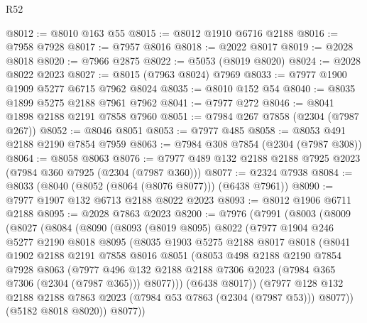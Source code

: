 \begin{lexlean}{R52}
\begin{coremodule}
@8012 := @8010 @163 @55
@8015 := @8012 @1910 @6716 @2188
@8016 := @7958 @7928
@8017 := @7957 @8016
@8018 := @2022 @8017
@8019 := @2028 @8018
@8020 := @7966 @2875
@8022 := @5053 (@8019 @8020)
@8024 := @2028 @8022 @2023
@8027 := @8015 (@7963 @8024) @7969
@8033 := @7977 @1900 @1909 @5277 @6715 @7962 @8024
@8035 := @8010 @152 @54
@8040 := @8035 @1899 @5275 @2188 @7961 @7962
@8041 := @7977 @272
@8046 := @8041 @1898 @2188 @2191 @7858 @7960
@8051 := @7984 @267 @7858 (@2304 (@7987 @267))
@8052 := @8046 @8051
@8053 := @7977 @485
@8058 := @8053 @491 @2188 @2190 @7854 @7959
@8063 := @7984 @308 @7854 (@2304 (@7987 @308))
@8064 := @8058 @8063
@8076 := @7977 @489 @132 @2188 @2188 @7925 @2023 (@7984 @360 @7925 (@2304 (@7987 @360)))
@8077 := @2324 @7938
@8084 := @8033 (@8040 (@8052 (@8064 (@8076 @8077))) (@6438 @7961))
@8090 := @7977 @1907 @132 @6713 @2188 @8022 @2023
@8093 := @8012 @1906 @6711 @2188
@8095 := @2028 @7863 @2023
@8200 := @7976
    (@7991
      (@8003
        (@8009
          (@8027
            (@8084
              (@8090
                (@8093
                  (@8019 @8095)
                  @8022
                  (@7977
                    @1904
                    @246
                    @5277
                    @2190
                    @8018
                    @8095
                    (@8035
                      @1903
                      @5275
                      @2188
                      @8017
                      @8018
                      (@8041
                        @1902
                        @2188
                        @2191
                        @7858
                        @8016
                        @8051
                        (@8053
                          @498
                          @2188
                          @2190
                          @7854
                          @7928
                          @8063
                          (@7977
                            @496
                            @132
                            @2188
                            @2188
                            @7306
                            @2023
                            (@7984 @365 @7306 (@2304 (@7987 @365)))
                            @8077)))
                      (@6438 @8017))
                    (@7977
                      @128
                      @132
                      @2188
                      @2188
                      @7863
                      @2023
                      (@7984 @53 @7863 (@2304 (@7987 @53)))
                      @8077))
                  (@5182 @8018 @8020))
                @8077))

\end{coremodule}
\end{lexlean}

